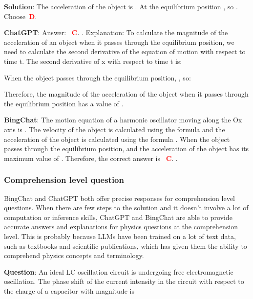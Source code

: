 \documentclass{article}
\begin{document}
{\begin{mdframed}[linewidth=1pt,linecolor=red]
		\begin{oneparchoices}
			\choice 
			\choice 
			\choice 
		\end{oneparchoices}
		
		\textbf{Solution}: The acceleration of the object is .
		At the equilibrium position , so . Choose~\textcolor{red}{\textbf{D}}.
		
		\textbf{ChatGPT}: Answer: ~\textcolor{red}{\textbf{C}}. . Explanation:
		To calculate the magnitude of the acceleration of an object when it passes through the equilibrium position, we need to calculate the second derivative of the equation of motion  with respect to time t. The second derivative of x with respect to time t is:
		
		When the object passes through the equilibrium position, , so:
		
		Therefore, the magnitude of the acceleration of the object when it passes through the equilibrium position has a value of .
		
		\textbf{BingChat}: The motion equation of a harmonic oscillator moving along the Ox axis is . The velocity of the object is calculated using the formula  and the acceleration of the object is calculated using the formula . When the object passes through the equilibrium position,  and the acceleration of the object has its maximum value of . Therefore, the correct answer is ~\textcolor{red}{\textbf{C}}. . 
		
	\end{mdframed}	
	
	\subsubsection{Comprehension level question}
	\label{VNHSGE_Phy_C}
	
	BingChat and ChatGPT both offer precise responses for comprehension level questions. When there are few steps to the solution and it doesn't involve a lot of computation or inference skills, ChatGPT and BingChat are able to provide accurate answers and explanations for physics questions at the comprehension level. This is probably because LLMs have been trained on a lot of text data, such as textbooks and scientific publications, which has given them the ability to comprehend physics concepts and terminology.
	
	
	\begin{mdframed}[linewidth=1pt,linecolor=red] \textbf{Question}: An ideal LC oscillation circuit is undergoing free electromagnetic oscillation. The phase shift of the current intensity in the circuit with respect to the charge of a capacitor with magnitude is
		

\end{mdframed}}
\end{document}

